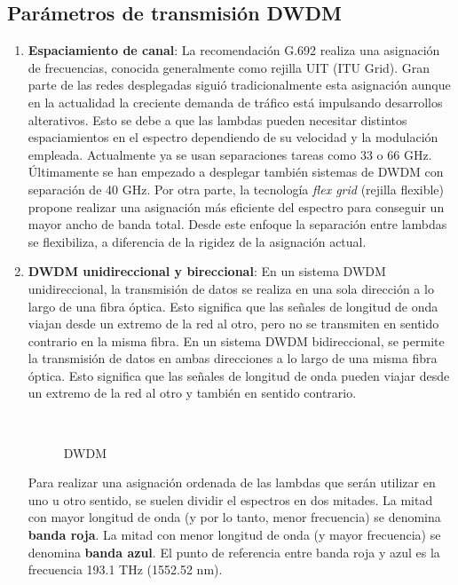 \documentclass[
	12pt, %
	fleqn, %
	a4paper, %
	oneside, %
]{LegrandOrangeBook}
\begin{document}
\subsection{Parámetros de transmisión DWDM}
\begin{enumerate}
\item \textbf{Espaciamiento de canal}: La recomendación G.692 realiza una asignación de frecuencias, conocida generalmente como rejilla UIT (ITU Grid). Gran parte de las redes desplegadas siguió tradicionalmente esta asignación aunque en la actualidad la creciente demanda de tráfico está impulsando desarrollos alterativos. Esto se debe a que las lambdas pueden necesitar distintos espaciamientos en el espectro dependiendo de su velocidad y la modulación empleada. Actualmente ya se usan separaciones tareas como 33 o 66 GHz. Últimamente se han empezado a desplegar también sistemas de DWDM con separación de 40 GHz. Por otra parte, la tecnología \textit{flex grid} (rejilla flexible) propone realizar una asignación más eficiente del espectro para conseguir un mayor ancho de banda total. Desde este enfoque la separación entre lambdas se flexibiliza, a diferencia de la rigidez de la asignación actual.
\item \textbf{DWDM unidireccional y bireccional}: En un sistema DWDM unidireccional, la transmisión de datos se realiza en una sola dirección a lo largo de una fibra óptica. Esto significa que las señales de longitud de onda viajan desde un extremo de la red al otro, pero no se transmiten en sentido contrario en la misma fibra. En un sistema DWDM bidireccional, se permite la transmisión de datos en ambas direcciones a lo largo de una misma fibra óptica. Esto significa que las señales de longitud de onda pueden viajar desde un extremo de la red al otro y también en sentido contrario.
\begin{figure}[H]
\centering
{}\\
\caption{DWDM}
\end{figure}
Para realizar una asignación ordenada de las lambdas que serán utilizar en uno u otro sentido, se suelen dividir el espectros en dos mitades. La mitad con mayor longitud de onda (y por lo tanto, menor frecuencia) se denomina \textbf{banda roja}. La mitad con menor longitud de onda (y mayor frecuencia) se denomina \textbf{banda azul}. El punto de referencia entre banda roja y azul es la frecuencia 193.1 THz (1552.52 nm).

\end{enumerate}
\end{document}
